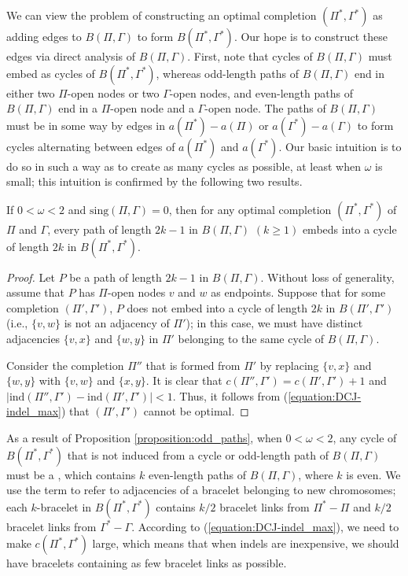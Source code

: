 We can view the problem of constructing an optimal completion $(\Pi^*, \Gamma^*)$ as adding edges to  $B(\Pi, \Gamma)$ to form $B(\Pi^*, \Gamma^*)$.  Our hope is to construct these edges via direct analysis of $B(\Pi, \Gamma)$.  First, note that cycles of $B(\Pi, \Gamma)$ must embed as cycles of $B(\Pi^*, \Gamma^*)$, whereas odd-length paths of $B(\Pi, \Gamma)$ end in either two $\Pi$-open nodes or two $\Gamma$-open nodes, and even-length paths of $B(\Pi, \Gamma)$ end in a $\Pi$-open node and a $\Gamma$-open node.  The paths of $B(\Pi, \Gamma)$ must be  in some way by edges in $a(\Pi^{*}) - a(\Pi)$ or $a(\Gamma^{*}) - a(\Gamma)$ to form cycles alternating between edges of $a(\Pi^{*})$ and $a(\Gamma^{*})$. Our basic intuition is to do so in such a way as to create as many cycles as possible, at least when $\omega$ is small; this intuition is confirmed by the following two results.

\begin{proposition}
If $0 < \omega < 2$ and $\mathrm{sing}(\Pi, \Gamma) = 0$, then for any optimal completion $(\Pi^*, \Gamma^*)$ of $\Pi$ and $\Gamma$, every path of length $2k-1$ in $B(\Pi, \Gamma)$ $(k \geq 1)$ embeds into a cycle of length $2k$ in $B(\Pi^*, \Gamma^*)$.
\label{proposition:odd_paths}
\end{proposition}

\begin{proof}
Let $P$ be a path of length $2k-1$ in $B(\Pi, \Gamma)$. Without loss of generality, assume that $P$ has $\Pi$-open nodes $v$ and $w$ as endpoints. Suppose that for some completion $(\Pi', \Gamma')$, $P$ does not embed into a cycle of length $2k$ in $B(\Pi', \Gamma')$ (i.e., $\{v, w\}$ is not an adjacency of $\Pi'$); in this case, we must have distinct adjacencies $\{v, x\}$ and $\{w, y\}$ in $\Pi'$ belonging to the same cycle of $B(\Pi, \Gamma)$.

Consider the completion $\Pi''$ that is formed from $\Pi'$ by replacing $\{v, x\}$ and $\{w, y\}$ with $\{v, w\}$ and $\{x, y\}$.  It is clear that $c(\Pi'', \Gamma') = c(\Pi', \Gamma') + 1$ and $|\mathrm{ind}(\Pi'', \Gamma') - \mathrm{ind}(\Pi', \Gamma')| < 1$.  Thus, it follows from (\ref{equation:DCJ-indel_max}) that $(\Pi', \Gamma')$ cannot be optimal. 
\end{proof}

\noindent As a result of Proposition \ref{proposition:odd_paths}, when $0 < \omega < 2$, any cycle of $B(\Pi^{*}, \Gamma^{*})$ that is not induced from a cycle or odd-length path of $B(\Pi, \Gamma)$ must be a , which contains $k$ even-length paths of $B(\Pi, \Gamma)$, where $k$ is even.  We use the term  to refer to adjacencies of a bracelet belonging to new chromosomes; each $k$-bracelet in $B(\Pi^{*}, \Gamma^{*})$ contains $k/2$ bracelet links from $\Pi^{*} - \Pi$ and $k/2$ bracelet links from $\Gamma^{*} - \Gamma$.  According to (\ref{equation:DCJ-indel_max}), we need to make $c(\Pi^{*}, \Gamma^{*})$ large, which means that when indels are inexpensive, we should have bracelets containing as few bracelet links as possible.

